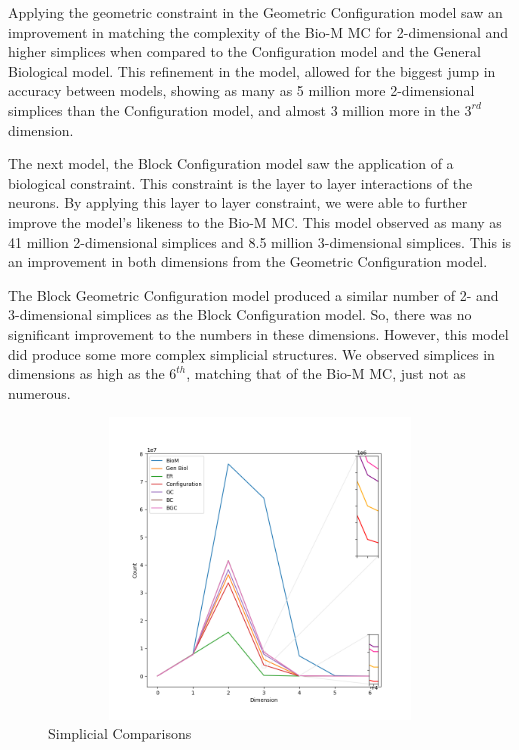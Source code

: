 Applying the geometric constraint in the Geometric Configuration model saw an improvement in matching the complexity of the Bio-M MC for 2-dimensional and higher simplices when compared to the Configuration model and the General Biological model. This refinement in the model, allowed for the biggest jump in accuracy between models, showing as many as 5 million more 2-dimensional simplices than the Configuration model, and almost 3 million more in the $3^{rd}$ dimension.

The next model, the Block Configuration model saw the application of a biological constraint. This constraint is the layer to layer interactions of the neurons. By applying this layer to layer constraint, we were able to further improve the model's likeness to the Bio-M MC. This model observed as many as 41 million 2-dimensional simplices and 8.5 million 3-dimensional simplices. This is an improvement in both dimensions from the Geometric Configuration model.

The Block Geometric Configuration model produced a similar number of 2- and 3-dimensional simplices as the Block Configuration model. So, there was no significant improvement to the numbers in these dimensions. However, this model did produce some more complex simplicial structures. We observed simplices in dimensions as high as the $6^{th}$, matching that of the Bio-M MC, just not as numerous.

\begin{figure}[H]
\begin{center}
\captionsetup{justification=centering}
\includegraphics[height=8cm,width=12cm]{graph/simplices_zoomed.png}
\caption{Simplicial Comparisons}
\end{center}
\end{figure}



